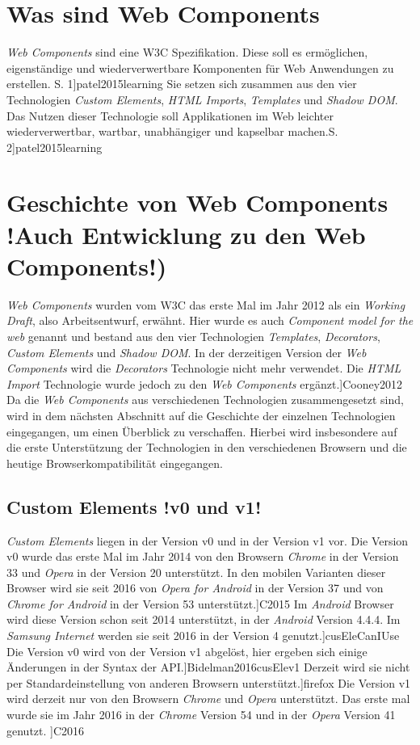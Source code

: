 \documentclass[12pt, paper=a4, bibtotoc, toc=listof, headsepline=true]{scrreprt}
\renewcommand{\smfootcite}[2][2]{\relax}
\begin{document}
		\section{Was sind Web Components}
		\emph{Web Components} sind eine \ac{W3C} Spezifikation. Diese soll es ermöglichen, eigenständige und wiederverwertbare Komponenten für Web Anwendungen zu erstellen. \smfootcite[ vgl.][S. 1]{patel2015learning} Sie setzen sich zusammen aus den vier Technologien \emph{Custom Elements}, \emph{\ac{HTML} Imports}, \emph{Templates} und \emph{Shadow \ac{DOM}}. Das Nutzen dieser Technologie soll Applikationen im Web leichter wiederverwertbar, wartbar, unabhängiger und kapselbar machen.\smfootcite[ vgl.][S. 2]{patel2015learning}
		\section{Geschichte von Web Components !Auch Entwicklung zu den Web Components!)}
		\label{ref:gesVonWebCom}
		\emph{Web Components} wurden vom \ac{W3C} das erste Mal im Jahr 2012 als ein \emph{Working Draft}, also Arbeitsentwurf, erwähnt. Hier wurde es auch \emph{Component model for the web} genannt und bestand aus den vier Technologien \emph{Templates}, \emph{Decorators}, \emph{Custom Elements} und \emph{Shadow DOM}. In der derzeitigen Version der \emph{Web Components} wird die \emph{Decorators} Technologie nicht mehr verwendet. Die \emph{\ac{HTML} Import} Technologie wurde jedoch zu den \emph{Web Components} ergänzt.\smfootcite[ vgl.][]{Cooney2012} Da die \emph{Web Components} aus verschiedenen Technologien zusammengesetzt sind, wird in dem nächsten Abschnitt auf die Geschichte der einzelnen Technologien eingegangen, um einen Überblick zu verschaffen. Hierbei wird insbesondere auf die erste Unterstützung der Technologien in den verschiedenen Browsern und die heutige Browserkompatibilität eingegangen.
		\subsection{Custom Elements !v0 und v1!}
		\emph{Custom Elements} liegen in der Version v0 und in der Version v1 vor. Die Version v0 wurde das erste Mal im Jahr 2014 von den Browsern \emph{Chrome} in der Version 33 und \emph{Opera} in der Version 20 unterstützt. In den mobilen Varianten dieser Browser  wird sie seit 2016 von \emph{Opera for Android} in der Version 37 und von \emph{Chrome for Android} in der Version 53 unterstützt.\smfootcite[ vgl.][]{C2015} Im \emph{Android} Browser wird diese Version schon seit 2014 unterstützt, in der \emph{Android} Version 4.4.4. Im \emph{Samsung Internet} werden sie seit 2016 in der Version 4 genutzt.\smfootcite[ vgl.][]{cusEleCanIUse} Die Version v0 wird von der Version v1 abgelöst, hier ergeben sich einige Änderungen in der Syntax der \ac{API}.\smfootcite[ vgl.][]{Bidelman2016cusElev1} Derzeit wird sie nicht per Standardeinstellung von anderen Browsern unterstützt.\smfootcite[ vgl.][]{firefox} Die Version v1 wird derzeit nur von den Browsern \emph{Chrome} und \emph{Opera} unterstützt. Das erste mal wurde sie im Jahr 2016 in der \emph{Chrome} Version 54 und in der \emph{Opera} Version 41 genutzt. \smfootcite[ vgl.][]{C2016}
\end{document}
